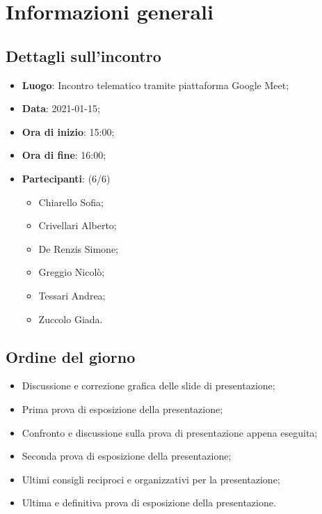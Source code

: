\section{Informazioni generali}

\subsection{Dettagli sull'incontro}
\begin{itemize}
\item \textbf{Luogo}: Incontro telematico tramite piattaforma Google Meet;
\item \textbf{Data}: 2021-01-15;
\item \textbf{Ora di inizio}: 15:00;
\item \textbf{Ora di fine}: 16:00;
\item \textbf{Partecipanti}: (6/6) 
\begin{itemize}
	\item Chiarello Sofia;
	\item Crivellari Alberto;
	\item De Renzis Simone;
	\item Greggio Nicolò;
	\item Tessari Andrea;
	\item Zuccolo Giada.
\end{itemize}
\end{itemize}

\subsection{Ordine del giorno}
\begin{itemize}
	\item Discussione e correzione grafica delle slide di presentazione;
	\item Prima prova di esposizione della presentazione;
	\item Confronto e discussione sulla prova di presentazione appena eseguita;
	\item Seconda prova di esposizione della presentazione;
	\item Ultimi consigli reciproci e organizzativi per la presentazione;
	\item Ultima e definitiva prova di esposizione della presentazione.
\end{itemize}
